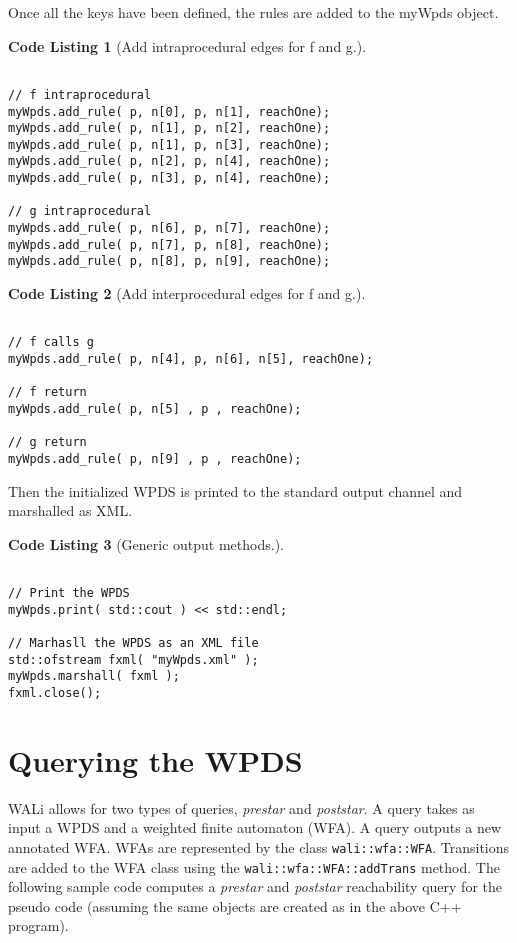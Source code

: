 \documentclass[english,a4paper,11pt]{article}
\theoremstyle{definition}
\newtheorem{codelist}{Code Listing}[section]
\begin{document}
Once all the keys have been defined, the rules are added to the
myWpds object.
\begin{codelist}[Add intraprocedural edges for f and g.]
\label{Intra}
\begin{lstlisting}

// f intraprocedural
myWpds.add_rule( p, n[0], p, n[1], reachOne);
myWpds.add_rule( p, n[1], p, n[2], reachOne);
myWpds.add_rule( p, n[1], p, n[3], reachOne);
myWpds.add_rule( p, n[2], p, n[4], reachOne);
myWpds.add_rule( p, n[3], p, n[4], reachOne);

// g intraprocedural
myWpds.add_rule( p, n[6], p, n[7], reachOne);
myWpds.add_rule( p, n[7], p, n[8], reachOne);
myWpds.add_rule( p, n[8], p, n[9], reachOne);
\end{lstlisting}
\end{codelist}

\begin{codelist}[Add interprocedural edges for f and g.]
\label{Intrer}
\begin{lstlisting}

// f calls g
myWpds.add_rule( p, n[4], p, n[6], n[5], reachOne);

// f return
myWpds.add_rule( p, n[5] , p , reachOne);

// g return
myWpds.add_rule( p, n[9] , p , reachOne);
\end{lstlisting}
\end{codelist}

Then the initialized WPDS is printed to the standard output
channel and marshalled as XML.
\begin{codelist}[Generic output methods.]
\label{Output}
\begin{lstlisting}

// Print the WPDS
myWpds.print( std::cout ) << std::endl;

// Marhasll the WPDS as an XML file
std::ofstream fxml( "myWpds.xml" );
myWpds.marshall( fxml );
fxml.close();
\end{lstlisting}
\end{codelist}


\section{Querying the WPDS}
\label{Se:Query}

WALi allows for two types of queries, \emph{prestar} and \emph{poststar}. A
query takes as input a WPDS and a weighted finite automaton (WFA). A query
outputs a new annotated WFA. WFAs are represented by the class
\verb!wali::wfa::WFA!. Transitions are added to the WFA class using the
\verb!wali::wfa::WFA::addTrans! method. The following sample code computes a
\emph{prestar} and \emph{poststar} reachability query for the pseudo code
(assuming the same objects are created as in the above C++ program).
\end{document}
